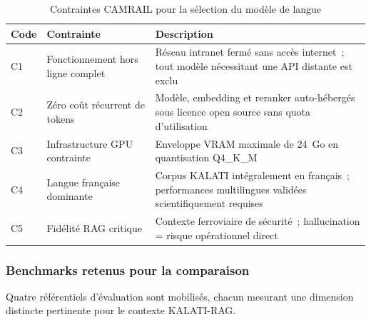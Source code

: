 \documentclass[12pt,a4paper]{report}
\begin{document}
\begin{table}[p]
\centering
\caption{Contraintes CAMRAIL pour la sélection du modèle de langue}
\label{tab:contraintes}
\renewcommand{\arraystretch}{1.4}
\begin{tabularx}{\linewidth}{@{} l l X @{}}
\toprule
\textbf{Code} & \textbf{Contrainte} & \textbf{Description} \\
\midrule
C1 & Fonctionnement hors ligne complet & Réseau intranet fermé sans accès internet~; tout
modèle nécessitant une API distante est exclu \\
C2 & Zéro coût récurrent de tokens & Modèle, embedding et reranker auto-hébergés sous licence
open source sans quota d'utilisation \\
C3 & Infrastructure GPU contrainte & Enveloppe VRAM maximale de 24~Go en quantisation Q4\_K\_M \\
C4 & Langue française dominante & Corpus KALATI intégralement en français~; performances
multilingues validées scientifiquement requises \\
C5 & Fidélité RAG critique & Contexte ferroviaire de sécurité~; hallucination = risque
opérationnel direct~\autocite{Dahl2024} \\
\bottomrule
\end{tabularx}
\end{table}

\subsubsection*{Benchmarks retenus pour la comparaison}

Quatre référentiels d'évaluation sont mobilisés, chacun mesurant une dimension distincte
pertinente pour le contexte KALATI-RAG.
\end{document}
